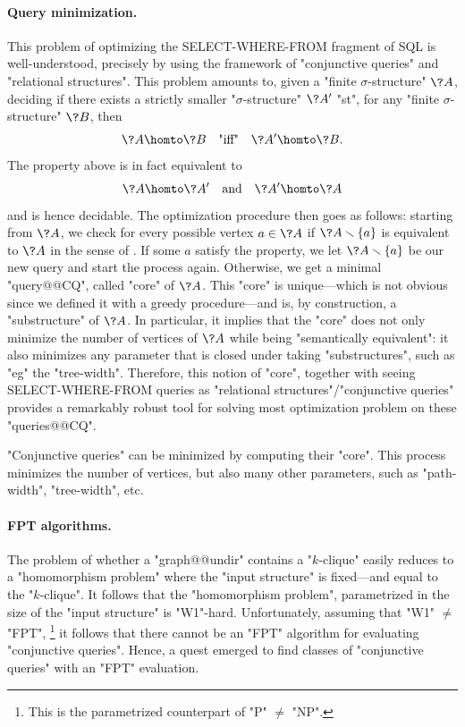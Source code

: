 \paragraph*{Query minimization.}
This problem of optimizing the \textsf{SELECT-WHERE-FROM} fragment of
SQL is well-understood, precisely by using the framework of "conjunctive queries"
and "relational structures".
This problem amounts to, given a "finite $\sigma$-structure" $\?A$,
deciding if there exists a strictly smaller "$\sigma$-structure" $\?A'$ "st",
for any "finite $\sigma$-structure" $\?B$, then
\[
	\?A \homto \?B
	\quad\text{"iff"}\quad
	\?A' \homto \?B.
\]
The property above is in fact equivalent to
\begin{equation}
	\?A \homto \?A'
	\quad\text{and}\quad
	\?A' \homto \?A
	\label{eq:intro-hom-equivalence}
\end{equation}
and is hence decidable.
The optimization procedure then goes as follows:
starting from $\?A$, we check for every possible vertex $a \in \?A$
if $\?A \smallsetminus \{a\}$ is equivalent to $\?A$ in the sense of
. If some $a$ satisfy the property, we
let $\?A \smallsetminus \{a\}$ be our new query and start the process again.
Otherwise, we get a minimal "query@@CQ", called "core" of $\?A$.
This "core" is unique---which is not obvious since we defined it with
a greedy procedure---and is, by construction, a "substructure" of $\?A$.
In particular, it implies that the "core" does not only minimize the number of
vertices of $\?A$ while being "semantically equivalent": it also minimizes any
parameter that is closed under taking "substructures", such as "eg" the "tree-width".
Therefore, this notion of "core", together with seeing
\textsf{SELECT-WHERE-FROM} queries as "relational structures"/"conjunctive queries"
provides a remarkably robust tool for solving most optimization problem on these "queries@@CQ".

\begin{known}
	"Conjunctive queries" can be minimized by computing their "core".
	This process minimizes the number of vertices, but also many other
	parameters, such as "path-width", "tree-width", etc.
\end{known}

\paragraph*{FPT algorithms.}
The problem of whether a "graph@@undir" contains a "$k$-clique" easily reduces to a
"homomorphism problem" where the "input structure" is fixed---and equal to the "$k$-clique".
It follows that the "homomorphism problem", parametrized in the
size of the "input structure" is "W1"-hard. Unfortunately, assuming that "W1" $\neq$ "FPT",%
\footnote{This is the parametrized counterpart of "P" $\neq$ "NP".}
it follows that there cannot be an "FPT" algorithm for evaluating "conjunctive queries".
Hence, a quest emerged to find classes of "conjunctive queries" with an "FPT" evaluation.

